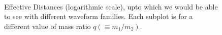 \documentclass[aps,
prd,
amsmath,
amssymb,
twocolumn,
floatfix,
groupedaddress]{revtex4-1}
\def\l({\left(}
\def\r){\right)}
\begin{document}
\begin{figure}
\\ 
  \caption{Effective Distances (logarithmic scale), upto which we would be able to see with different waveform families. Each subplot is for a different value of mass ratio $q \l(\equiv m_1/m_2\r)$.}
  \label{fig:DeffsLog}
\end{figure}
\end{document}
